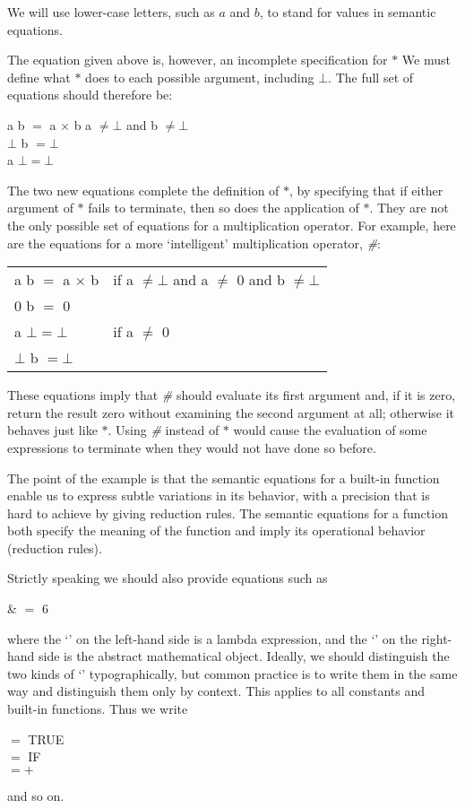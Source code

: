 We will use lower-case letters, such as $a$ and $b$, to stand for values in
semantic equations.

The equation given above is, however, an incomplete specification for $*$
We must define what $*$ does to each possible argument, including $\bot$. The full
set of equations should therefore be:
\begin{mlcoded}
    \evalbb{$*$} a b $=$ a $\times$ b  a $\neq \bot$ {\normalfont and} b $\neq \bot$ \\
    \evalbb{$*$} $\bot$ b $= \bot$ \\
    \evalbb{$*$} a $\bot = \bot$
\end{mlcoded}
The two new equations complete the definition of $*$, by specifying that if
either argument of $*$ fails to terminate, then so does the application of $*$.
They are not the only possible set of equations for a multiplication
operator. For example, here are the equations for a more `intelligent'
multiplication operator, \textit{\#}:
\begin{mlcoded}
    \hspace{-2em}
    \begin{tabular}{ll}
        \evalbb{\textit{\#}} a b $=$ a $\times$ b &{\normalfont if} a $\neq \bot$ {\normalfont and} a $\neq$ 0 {\normalfont and} b $\neq \bot$\\
    \evalbb{\textit{\#}} 0 b $=$ 0 &\\
    \evalbb{\textit{\#}} a $\bot = \bot$ &{\normalfont if} a $\neq$ 0 \\
    \evalbb{\textit{\#}} $\bot$ b $= \bot$ &
    \end{tabular}
\end{mlcoded}
These equations imply that \textit{\#} should evaluate its first argument and, if it is
zero, return the result zero without examining the second argument at all;
otherwise it behaves just like $*$. Using \textit{\#} instead of $*$ would cause the
evaluation of some expressions to terminate when they would not have done
so before.

The point of the example is that the semantic equations for a built-in
function enable us to express subtle variations in its behavior, with a precision
that is hard to achieve by giving reduction rules. The semantic equations for a
function both specify the meaning of the function and imply its operational
behavior (reduction rules).

Strictly speaking we should also provide equations such as
\begin{mlalign}
     & $=$ 6
\end{mlalign}
where the `' on the left-hand side is a lambda expression, and the `' on the
right-hand side is the abstract mathematical object. Ideally, we should distinguish the two kinds of `' typographically, but common practice is to
write them in the same way and distinguish them only by context. This applies
to all constants and built-in functions. Thus we write
\begin{mlcoded}
     $=$ TRUE \\
     $=$ IF \\
    \evalbb{$+$} $= +$
\end{mlcoded}
and so on.

